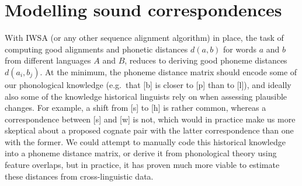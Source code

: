 \begin{table}
\centering
{}
\caption{Comparison of normalized weighted string distances on Arabic and Hebrew}
\label{iwsa-ranking-ara-heb}
\end{table}

\section{Modelling sound correspondences}\label{sec:4.4}
With IWSA (or any other sequence alignment algorithm) in place, the task of computing good alignments and phonetic distances $d(a,b)$ for words $a$ and $b$ from different languages $A$ and $B$, reduces to deriving good phoneme distances $d(a_i,b_j)$. At the minimum, the phoneme distance matrix should encode some of our phonological knowledge (e.g.\ that [b] is closer to [p] than to [l]), and ideally also some of the knowledge historical linguists rely on when assessing plausible changes. For example, a shift from [s] to [h] is rather common, whereas a correspondence between [s] and [w] is not, which would in practice make us more skeptical about a proposed cognate pair with the latter correspondence than one with the former. We could attempt to manually code this historical knowledge into a phoneme distance matrix, or derive it from phonological theory using feature overlaps, but in practice, it has proven much more viable to estimate these distances from cross-linguistic data.

